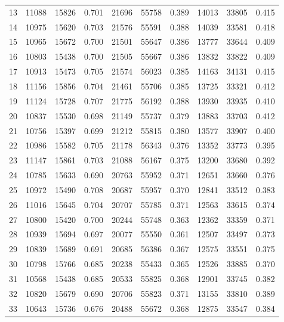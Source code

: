 \begin{table}
\begin{tabular}{c|C{1cm}C{1cm}C{1cm}|C{1cm}C{1cm}C{1cm}|C{1cm}C{1cm}C{1cm}}
13 & 11088 & 15826 & 0.701 & 21696 & 55758 & 0.389 & 14013 & 33805 & 0.415 \\
14 & 10975 & 15620 & 0.703 & 21576 & 55591 & 0.388 & 14039 & 33581 & 0.418 \\
15 & 10965 & 15672 & 0.700 & 21501 & 55647 & 0.386 & 13777 & 33644 & 0.409 \\
16 & 10803 & 15438 & 0.700 & 21505 & 55667 & 0.386 & 13832 & 33822 & 0.409 \\
17 & 10913 & 15473 & 0.705 & 21574 & 56023 & 0.385 & 14163 & 34131 & 0.415 \\
18 & 11156 & 15856 & 0.704 & 21461 & 55706 & 0.385 & 13725 & 33321 & 0.412 \\
19 & 11124 & 15728 & 0.707 & 21775 & 56192 & 0.388 & 13930 & 33935 & 0.410 \\
20 & 10837 & 15530 & 0.698 & 21149 & 55737 & 0.379 & 13883 & 33703 & 0.412 \\
21 & 10756 & 15397 & 0.699 & 21212 & 55815 & 0.380 & 13577 & 33907 & 0.400 \\
22 & 10986 & 15582 & 0.705 & 21178 & 56343 & 0.376 & 13352 & 33773 & 0.395 \\
23 & 11147 & 15861 & 0.703 & 21088 & 56167 & 0.375 & 13200 & 33680 & 0.392 \\
24 & 10785 & 15633 & 0.690 & 20763 & 55952 & 0.371 & 12651 & 33660 & 0.376 \\
25 & 10972 & 15490 & 0.708 & 20687 & 55957 & 0.370 & 12841 & 33512 & 0.383 \\
26 & 11016 & 15645 & 0.704 & 20707 & 55785 & 0.371 & 12563 & 33615 & 0.374 \\
27 & 10800 & 15420 & 0.700 & 20244 & 55748 & 0.363 & 12362 & 33359 & 0.371 \\
28 & 10939 & 15694 & 0.697 & 20077 & 55550 & 0.361 & 12507 & 33497 & 0.373 \\
29 & 10839 & 15689 & 0.691 & 20685 & 56386 & 0.367 & 12575 & 33551 & 0.375 \\
30 & 10798 & 15766 & 0.685 & 20238 & 55433 & 0.365 & 12526 & 33885 & 0.370 \\
31 & 10568 & 15438 & 0.685 & 20533 & 55825 & 0.368 & 12901 & 33745 & 0.382 \\
32 & 10820 & 15679 & 0.690 & 20706 & 55823 & 0.371 & 13155 & 33810 & 0.389 \\
33 & 10643 & 15736 & 0.676 & 20488 & 55672 & 0.368 & 12875 & 33547 & 0.384 \\

\end{tabular}
\end{table}
